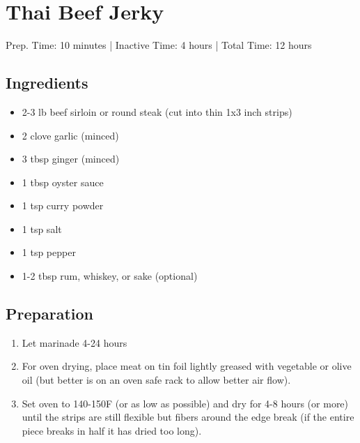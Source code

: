 \section{Thai Beef Jerky}

Prep. Time: 10 minutes |
Inactive Time: 4 hours |
Total Time: 12 hours

\subsection{Ingredients}
\begin{multicols}{2}
\begin{itemize}
    \item 2-3 lb beef sirloin or round steak (cut into thin 1x3 inch strips)
    \item 2 clove garlic (minced)
    \item 3 tbsp ginger (minced)
    \item 1 tbsp oyster sauce
    \item 1 tsp curry powder
    \item 1 tsp salt
    \item 1 tsp pepper
    \item 1-2 tbsp rum, whiskey, or sake (optional)
\end{itemize}
\end{multicols}

\subsection{Preparation}
\begin{enumerate}
    \item Let marinade 4-24 hours
    \item For oven drying, place meat on tin foil lightly greased with vegetable or olive oil (but better is on an oven safe rack to allow better air flow). 
    \item Set oven to 140-150F (or as low as possible) and dry for 4-8 hours (or more) until the strips are still flexible but fibers around the edge break (if the entire piece breaks in half it has dried too long).
\end{enumerate}
